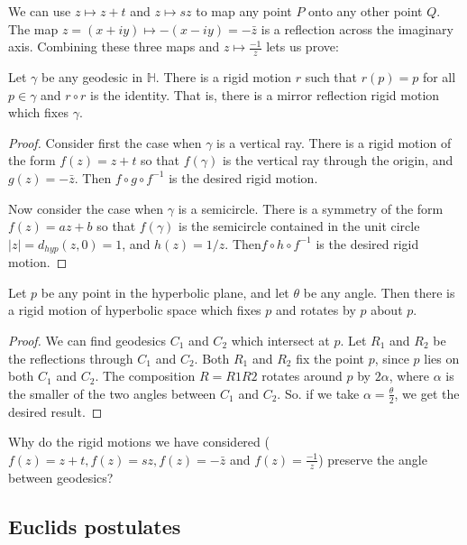 \documentclass[newpage,hints,handout]{ximera}
\begin{document}
We can use $z\mapsto z+t$ and $z\mapsto sz$ to map any point $P$ onto any other point $Q$. The map $z=(x+iy)\mapsto-(x-iy)=-\bar z$ is a reflection across the imaginary axis. Combining these three maps and $z\mapsto\frac{-1}{z}$ lets us prove:

\begin{theorem}
Let $\gamma$ be any geodesic in $\mathbb{H}$. There is a rigid motion $r$ such that
$r(p) = p$ for all $p \in\gamma$ and $r\circ r$ is the identity. That is, there is a mirror
reflection rigid motion which fixes $\gamma$.
\end{theorem}
\begin{proof}
Consider first the case when $\gamma$ is a vertical ray. There is a rigid motion
of the form $f(z) = z + t$ so that $f(\gamma)$ is the vertical ray through the origin, and $g(z)=-\bar z$. Then $f\circ g\circ f^{-1}$ is the desired rigid motion.

Now consider the case when $\gamma$ is a semicircle. There is a symmetry of the
form $f(z) = az + b$ so that $f(\gamma)$ is the semicircle contained in the unit circle $|z|=d_{hyp}(z,0)=1$, and $h(z) = 1/z$. Then$f\circ h\circ f^{-1}$ is the desired rigid motion.
\end{proof}

\begin{theorem}
 Let $p$ be any point in the hyperbolic plane, and let $\theta$ be any
angle. Then there is a rigid motion of hyperbolic space which fixes $p$ and rotates by $p$
about $p$.
\end{theorem}
\begin{proof}
 We can find geodesics $C_1$ and $C_2$ which intersect at $p$. Let $R_1$ and
$R_2$ be the reflections through $C_1$ and $C_2$. Both $R_1$ and $R_2$ fix the point $p$,
since $p$ lies on both $C_1$ and $C_2$. The composition $R = R1R2$ rotates around
$p$ by $2\alpha$, where $\alpha$ is the smaller of the two angles between $C_1$ and $C_2$. So. if
we take $\alpha=\tfrac{\theta}{2}$, we get the desired result. 
\end{proof}

\begin{problem}
 Why do the rigid motions we have considered ($f(z)=z+t, f(z)=sz,f(z)=-\bar z$ and $f(z)=\frac{-1}{z}$) preserve the angle between geodesics?
\end{problem}
 
\subsection{Euclids postulates}
\end{document}
